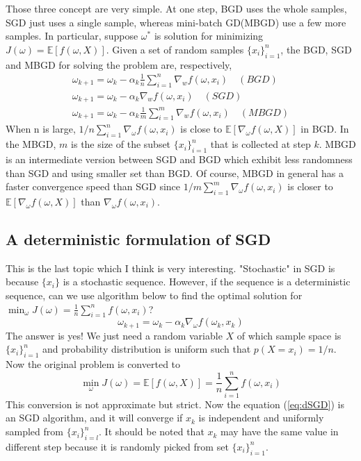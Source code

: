     Those three concept are very simple. At one step, BGD uses the whole samples, SGD just uses a single sample, whereas
    mini-batch GD(MBGD) use a few more samples. In particular, suppose $\omega^{*}$ is solution for minimizing
    $J(\omega)=\mathbb{E}[f(\omega,X)]$. Given a set of random samples $\{x_{i}\}_{i=1}^{n}$, the BGD, SGD and MBGD for
    solving the problem are, respectively,
    \begin{align*}
      \omega_{k+1} = \omega_{k} - \alpha_{k}\frac{1}{n}\sum_{i=1}^{n}\nabla_{w}f(\omega,x_{i}) \quad (BGD) \\
      \omega_{k+1} = \omega_{k} - \alpha_{k}\nabla_{w}f(\omega,x_{i}) \quad (SGD)                          \\
      \omega_{k+1} = \omega_{k} - \alpha_{k}\frac{1}{m}\sum_{i=1}^{m}\nabla_{w}f(\omega,x_{i}) \quad (MBGD)
    \end{align*}
    When n is large, $1/n \sum_{i=1}^{n} \nabla_{\omega}f(\omega,x_{i})$ is close to $\mathbb{E}[\nabla_{\omega}f(\omega,
        X)]$ in BGD. In the MBGD, $m$ is the size of the subset $\{x_{i}\}_{i=1}^{n}$ that is collected at step $k$. MBGD is
    an intermediate version between SGD and BGD which exhibit less randomness than SGD and using smaller set than BGD. Of
    course, MBGD in general has a faster convergence speed than SGD since $1/m \sum_{i=1}^{m}
      \nabla_{\omega}f(\omega,x_{i})$ is closer to $\mathbb{E}[\nabla_{\omega}f(\omega, X)]$ than
    $\nabla_{\omega}f(\omega,x_{i})$.

  \subsection{A deterministic formulation of SGD}

    This is the last topic which I think is very interesting. "Stochastic" in SGD is because $\{x_{i}\}$ is a stochastic
    sequence. However, if the sequence is a deterministic sequence, can we use algorithm below to find the optimal solution
    for $\min_{\omega} J(\omega) = \frac{1}{n}\sum_{i=1}^{n}f(\omega,x_{i})$?
    \begin{equation}
      \label{eq:dSGD}
      \omega_{k+1} = \omega_{k} - \alpha_{k} \nabla_{\omega}f(\omega_{k},x_{k})
    \end{equation}
    The answer is yes! We just need a random variable $X$ of which sample space is $\{x_{i}\}_{i=1}^{n}$ and probability
    distribution is uniform such that $p(X=x_{i})=1/n$. Now the original problem is converted to
    \begin{equation*}
      \min_{\omega} J(\omega) = \mathbb{E}[f(\omega,X)] = \frac{1}{n}\sum_{i=1}^{n}f(\omega,x_{i})
    \end{equation*}
    This conversion is not approximate but  strict. Now the equation (\ref{eq:dSGD}) is an SGD algorithm, and it will
    converge if $x_{k}$ is independent and uniformly sampled from $\{x_{i}\}_{i=l}^{n}$. It should be noted that $x_{k}$ may
    have the same value in different step because it is randomly picked from set $\{x_{i}\}_{i=1}^{n}$.
